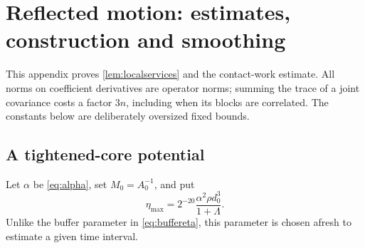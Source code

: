 \documentclass[11pt]{article}
\numberwithin{equation}{section}
\theoremstyle{definition}
\theoremstyle{remark}\newtheorem{remark}[theorem]{Remark}
\begin{document}
\section{Reflected motion: estimates, construction and smoothing}
\label{app:reflection}

This appendix proves \cref{lem:localservices} and the contact-work estimate.
All norms on coefficient derivatives are operator norms; summing the trace
of a joint covariance costs a factor $3n$, including when its blocks are
correlated. The constants below are deliberately oversized fixed bounds.

\subsection{A tightened-core potential}

Let $\alpha$ be \eqref{eq:alpha}, set $M_0=A_0^{-1}$, and put
\begin{equation}\label{eq:etamax}
 \eta_{\max}=2^{-20}\frac{\alpha^2\rho d_0^3}{1+\Lambda}.
\end{equation}
Unlike the buffer parameter in \eqref{eq:buffereta}, this parameter is
chosen afresh to estimate a given time interval.
\end{document}
